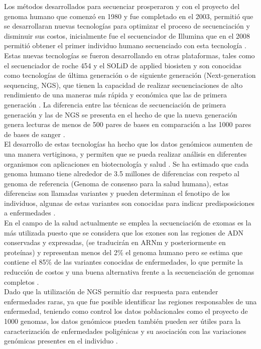 Los métodos desarrollados para secuenciar prosperaron y con el proyecto del genoma humano que comenzó en 1980 y fue completado en el 2003, permitió que se desarrollaran nuevas tecnologías para optimizar el proceso de secuenciación y disminuir sus costos, inicialmente fue el secuenciador de Illumina  que en el 2008 permitió obtener el primer individuo humano secuenciado con esta tecnología \cite{Pei}. Estas nuevas tecnologías se fueron desarrollando en otras plataformas, tales como el secuenciador de roche 454 y el SOLiD de applied biosisten \cite{Pei} y son conocidas como tecnologías de última generación o de siguiente generación (Next-generation sequencing, NGS), que tienen la capacidad de realizar secuenciaciones de alto rendimiento de una maneras más rápida y económica que las de primera generación \cite{Herraez2012}. La diferencia entre las técnicas de secuenciación de primera generación y las de NGS se presenta en el hecho de que la nueva generación genera lecturas de menos de 500 pares de bases en comparación a las 1000 pares de bases de sanger \cite{Pei,Kulski2016}. \\
 
El desarrollo de estas tecnologías ha hecho que los datos genómicos aumenten de una manera vertiginosa, y permiten que se pueda realizar análisis en diferentes organismos con aplicaciones en biotecnología y salud \cite{Herraez2012}. Se ha estimado que cada genoma humano tiene alrededor de 3.5 millones de diferencias con respeto al genoma de referencia (Genoma de consenso para la salud humana), estas diferencias son llamadas variantes y pueden determinan el fenotipo de los individuos, algunas de estas variantes son conocidas para indicar predisposiciones a enfermedades \cite{Kutzera2017}.\\

En el campo de la salud actualmente se emplea la secuenciación de exomas es la más utilizada puesto que se considera que los exones son las regiones de ADN conservadas y expresadas, (se traducirán en ARNm y posteriormente en proteínas) y representan menos del 2\% el genoma humano pero se estima que contiene el 85\% de las variantes conocidas de enfermedades, lo que permite la reducción de costos y una buena alternativa frente a la secuenciación de genomas completos \cite{Illumina2017,Klug2013,Herraez2012}.\\

Dado que la utilización de NGS permitío dar respuesta para entender enfermedades raras, ya que fue posible identificar las regiones responsables de una enfermedad, teniendo como control los datos poblacionales como el proyecto de 1000 genomas, los datos genómicos pueden también pueden ser útiles para la caracterización de enfermedades poligénicas y su asociación con las variaciones genómicas presentes en el individuo \cite{Poliakov2015}. 

